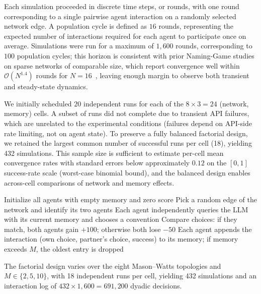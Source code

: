 \documentclass{article}
\begin{document}
Each simulation proceeded in discrete time steps, or rounds, with one round corresponding to a single pairwise agent interaction on a randomly selected network edge. A population cycle is defined as $16$ rounds, representing the expected number of interactions required for each agent to participate once on average. Simulations were run for a maximum of $1{,}600$ rounds, corresponding to $100$ population cycles; this horizon is consistent with prior Naming-Game studies on sparse networks of comparable size, which report convergence well within $\mathcal{O}(N^{1.4})$ rounds for $N=16$~\cite{dallasta2006nonequilibrium}, leaving enough margin to observe both transient and steady-state dynamics.

We initially scheduled $20$ independent runs for each of the $8 \times 3 = 24$ (network, memory) cells. A subset of runs did not complete due to transient API failures, which are unrelated to the experimental conditions (failures depend on API-side rate limiting, not on agent state). To preserve a fully balanced factorial design, we retained the largest common number of successful runs per cell (18), yielding 432 simulations. This sample size is sufficient to estimate per-cell mean convergence rates with standard errors below approximately $0.12$ on the $[0,1]$ success-rate scale (worst-case binomial bound), and the balanced design enables across-cell comparisons of network and memory effects.

\begin{algorithm}[H]
\caption{Networked Naming-Game with bounded-memory LLM agents}
\label{alg:simulation}
\begin{algorithmic}[1]
\State Initialize all agents with empty memory and zero score
    \State Pick a random edge of the network and identify its two agents
    \State Each agent independently queries the LLM with its current memory and chooses a convention
    \State Compare choices: if they match, both agents gain $+100$; otherwise both lose $-50$
    \State Each agent appends the interaction (own choice, partner's choice, success) to its memory; if memory exceeds $M$, the oldest entry is dropped
\EndFor
\end{algorithmic}
\end{algorithm}

The factorial design varies over the eight Mason--Watts topologies and $M \in \{2, 5, 10\}$, with 18 independent runs per cell, yielding 432 simulations and an interaction log of $432 \times 1{,}600 = 691{,}200$ dyadic decisions.
\end{document}
